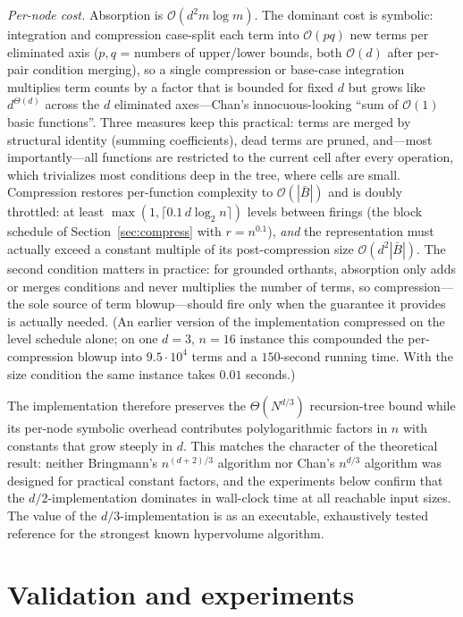 \documentclass[11pt,a4paper]{article}
\theoremstyle{remark}
\newcommand{\Oh}{\mathcal{O}}
\begin{document}
\emph{Per-node cost.}  Absorption is $\Oh(d^2 m\log m)$.  The dominant cost
is symbolic: integration and compression case-split each term into
$\Oh(pq)$ new terms per eliminated axis ($p,q$ = numbers of upper/lower
bounds, both $\Oh(d)$ after per-pair condition merging), so a single
compression or base-case integration multiplies term counts by a factor that
is bounded for fixed $d$ but grows like $d^{\Theta(d)}$ across the $d$
eliminated axes---Chan's innocuous-looking ``sum of $\Oh(1)$ basic
functions''.  Three measures keep this practical: terms are merged by
structural identity (summing coefficients), dead terms are pruned, and---most
importantly---all functions are restricted to the current cell after every
operation, which trivializes most conditions deep in the tree, where cells
are small.  Compression restores per-function complexity to $\Oh(|\bar B|)$
and is doubly throttled: at least $\max(1,\lceil 0.1\,d\log_2 n\rceil)$
levels between firings (the block schedule of Section~\ref{sec:compress}
with $r=n^{0.1}$), \emph{and} the representation must actually exceed a
constant multiple of its post-compression size $\Oh(d^2|\bar B|)$.  The
second condition matters in practice: for grounded orthants, absorption only
adds or merges conditions and never multiplies the number of terms, so
compression---the sole source of term blowup---should fire only when the
guarantee it provides is actually needed.  (An earlier version of the
implementation compressed on the level schedule alone; on one $d{=}3$,
$n{=}16$ instance this compounded the per-compression blowup into
$9.5\cdot10^4$ terms and a $150$-second running time.  With the size
condition the same instance takes $0.01$ seconds.)

The implementation therefore preserves the $\Theta(N^{d/3})$ recursion-tree
bound while its per-node symbolic overhead contributes polylogarithmic
factors in $n$ with constants that grow steeply in $d$.  This matches the
character of the theoretical result: neither Bringmann's $n^{(d+2)/3}$
algorithm nor Chan's $n^{d/3}$ algorithm was designed for practical constant
factors, and the experiments below confirm that the $d/2$-implementation
dominates in wall-clock time at all reachable input sizes.  The value of the
$d/3$-implementation is as an executable, exhaustively tested reference for
the strongest known hypervolume algorithm.

\section{Validation and experiments}
\label{sec:experiments}
\end{document}
